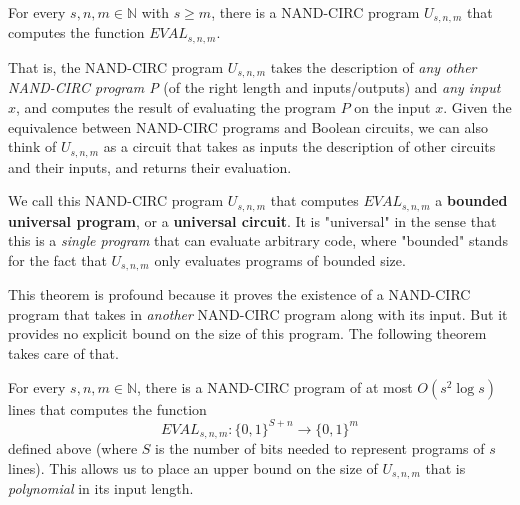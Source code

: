   \begin{theorem}
  For every $s, n, m \in \mathbb{N}$ with $s \geq m$, there is a NAND-CIRC program $U_{s, n, m}$ that computes the function $EVAL_{s, n, m}$. 
  \end{theorem}

  That is, the NAND-CIRC program $U_{s, n, m}$ takes the description of \textit{any other NAND-CIRC program P} (of the right length and inputs/outputs) and \textit{any input $x$}, and computes the result of evaluating the program $P$ on the input $x$. Given the equivalence between NAND-CIRC programs and Boolean circuits, we can also think of $U_{s, n, m}$ as a circuit that takes as inputs the description of other circuits and their inputs, and returns their evaluation. 

  \begin{definition}
  We call this NAND-CIRC program $U_{s, n, m}$ that computes $EVAL_{s, n, m}$ a \textbf{bounded universal program}, or a \textbf{universal circuit}. It is "universal" in the sense that this is a \textit{single program} that can evaluate arbitrary code, where "bounded" stands for the fact that $U_{s, n, m}$ only evaluates programs of bounded size. 
  \end{definition}

  This theorem is profound because it proves the existence of a NAND-CIRC program that takes in \textit{another} NAND-CIRC program along with its input. But it provides no explicit bound on the size of this program. The following theorem takes care of that. 

  \begin{theorem}
  For every $s, n, m \in \mathbb{N}$, there is a NAND-CIRC program of at most $O(s^2 \log s)$ lines that computes the function 
  \[EVAL_{s, n, m}: \{0,1\}^{S+n} \longrightarrow \{0,1\}^m\]
  defined above (where $S$ is the number of bits needed to represent programs of $s$ lines). This allows us to place an upper bound on the size of $U_{s, n, m}$ that is \textit{polynomial} in its input length. 
  \end{theorem}


